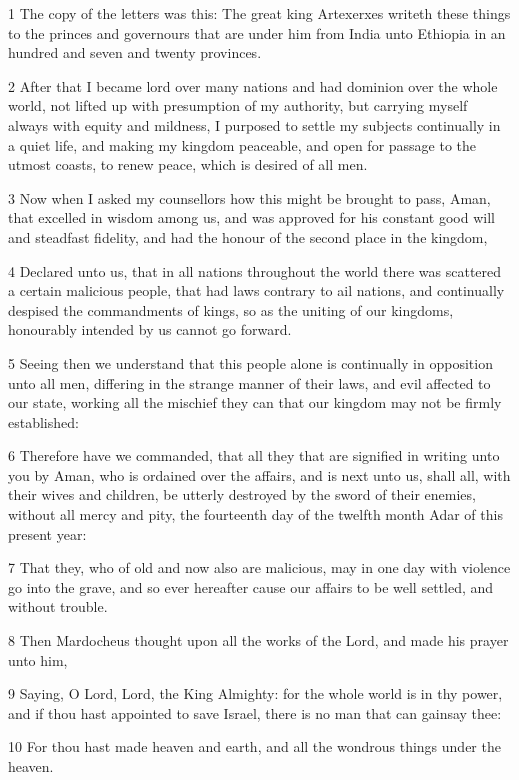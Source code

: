 \par 1 The copy of the letters was this: The great king Artexerxes writeth these things to the princes and governours that are under him from India unto Ethiopia in an hundred and seven and twenty provinces.
\par 2 After that I became lord over many nations and had dominion over the whole world, not lifted up with presumption of my authority, but carrying myself always with equity and mildness, I purposed to settle my subjects continually in a quiet life, and making my kingdom peaceable, and open for passage to the utmost coasts, to renew peace, which is desired of all men.
\par 3 Now when I asked my counsellors how this might be brought to pass, Aman, that excelled in wisdom among us, and was approved for his constant good will and steadfast fidelity, and had the honour of the second place in the kingdom,
\par 4 Declared unto us, that in all nations throughout the world there was scattered a certain malicious people, that had laws contrary to ail nations, and continually despised the commandments of kings, so as the uniting of our kingdoms, honourably intended by us cannot go forward.
\par 5 Seeing then we understand that this people alone is continually in opposition unto all men, differing in the strange manner of their laws, and evil affected to our state, working all the mischief they can that our kingdom may not be firmly established:
\par 6 Therefore have we commanded, that all they that are signified in writing unto you by Aman, who is ordained over the affairs, and is next unto us, shall all, with their wives and children, be utterly destroyed by the sword of their enemies, without all mercy and pity, the fourteenth day of the twelfth month Adar of this present year:
\par 7 That they, who of old and now also are malicious, may in one day with violence go into the grave, and so ever hereafter cause our affairs to be well settled, and without trouble.
\par 8 Then Mardocheus thought upon all the works of the Lord, and made his prayer unto him,
\par 9 Saying, O Lord, Lord, the King Almighty: for the whole world is in thy power, and if thou hast appointed to save Israel, there is no man that can gainsay thee:
\par 10 For thou hast made heaven and earth, and all the wondrous things under the heaven.
